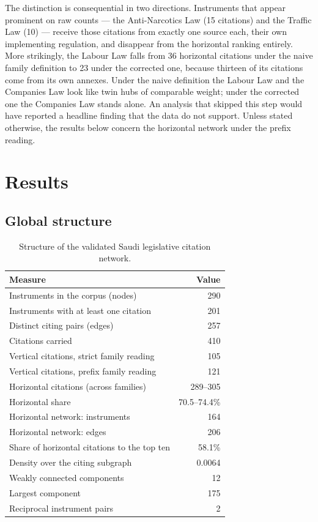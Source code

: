 \documentclass[sn-basic]{sn-jnl}%
\begin{document}
The distinction is consequential in two directions. Instruments that appear
prominent on raw counts --- the Anti-Narcotics Law (15 citations) and the
Traffic Law (10) --- receive those citations from exactly one source each,
their own implementing regulation, and disappear from the horizontal ranking
entirely. More strikingly, the Labour Law falls from 36 horizontal citations
under the naive family definition to 23 under the corrected one, because
thirteen of its citations come from its own annexes. Under the naive
definition the Labour Law and the Companies Law look like twin hubs of
comparable weight; under the corrected one the Companies Law stands alone.
An analysis that skipped this step would have reported a headline finding
that the data do not support. Unless stated otherwise, the results below
concern the horizontal network under the prefix reading.

\section{Results}
\label{sec:results}

\subsection{Global structure}

\begin{table}[t]
\centering
\small
\begin{tabular}{lr}
\toprule
\textbf{Measure} & \textbf{Value} \\
\midrule
Instruments in the corpus (nodes) & 290 \\
Instruments with at least one citation & 201 \\
Distinct citing pairs (edges) & 257 \\
Citations carried & 410 \\
\midrule
Vertical citations, strict family reading & 105 \\
Vertical citations, prefix family reading & 121 \\
Horizontal citations (across families) & 289--305 \\
Horizontal share & 70.5--74.4\% \\
\midrule
Horizontal network: instruments & 164 \\
Horizontal network: edges & 206 \\
Share of horizontal citations to the top ten & 58.1\% \\
Density over the citing subgraph & 0.0064 \\
Weakly connected components & 12 \\
Largest component & 175 \\
Reciprocal instrument pairs & 2 \\
\bottomrule
\end{tabular}
\caption{Structure of the validated Saudi legislative citation network.}
\label{tab:structure}
\end{table}
\end{document}
